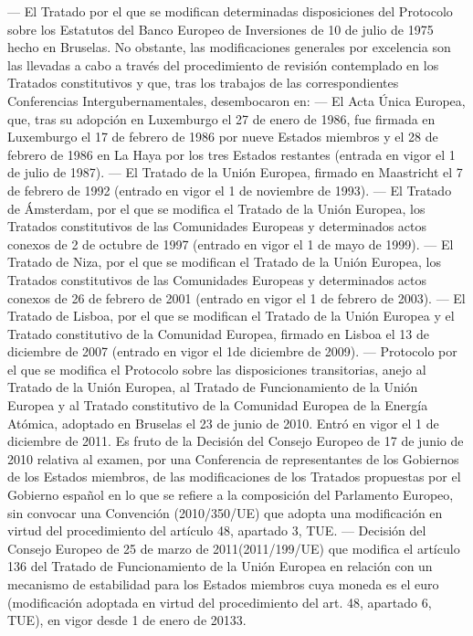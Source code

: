 \documentclass[10pt,a4paper]{article}
\begin{document}
— El Tratado por el que se modifican determinadas disposiciones del Protocolo sobre los Estatutos del Banco Europeo de Inversiones de 10 de julio de 1975 hecho en Bruselas. No obstante, las modificaciones generales por excelencia son las llevadas a cabo a través del procedimiento de revisión contemplado en los Tratados constitutivos y que, tras los trabajos de las correspondientes Conferencias Intergubernamentales, desembocaron en:
— El Acta Única Europea, que, tras su adopción en Luxemburgo el 27 de enero de 1986, fue firmada en Luxemburgo el 17 de febrero de 1986 por nueve Estados miembros y el 28 de febrero de 1986 en La Haya por los tres Estados restantes (entrada en vigor el 1 de julio de 1987).
— El Tratado de la Unión Europea, firmado en Maastricht el 7 de febrero de 1992 (entrado en vigor el 1 de noviembre de 1993).
— El Tratado de Ámsterdam, por el que se modifica el Tratado de la Unión Europea, los Tratados constitutivos de las Comunidades Europeas y determinados actos conexos de 2 de octubre de 1997 (entrado en vigor el 1 de mayo de 1999).
— El Tratado de Niza, por el que se modifican el Tratado de la Unión Europea, los Tratados constitutivos de las Comunidades Europeas y determinados actos conexos de 26 de febrero de 2001 (entrado en vigor el 1 de febrero de 2003). 
— El Tratado de Lisboa, por el que se modifican el Tratado de la Unión Europea y el Tratado constitutivo de la Comunidad Europea, firmado en Lisboa el 13 de diciembre de 2007 (entrado en vigor el 1de diciembre de 2009).
— Protocolo por el que se modifica el Protocolo sobre las disposiciones transitorias, anejo al Tratado de la Unión Europea, al Tratado de Funcionamiento de la Unión Europea y al Tratado constitutivo de la Comunidad Europea de la Energía Atómica, adoptado en Bruselas el 23 de junio de 2010. Entró en vigor el 1 de diciembre de 2011. Es fruto de la Decisión del Consejo Europeo de 17 de junio de 2010 relativa al examen, por una Conferencia de representantes de los Gobiernos de los Estados miembros, de las modificaciones de los Tratados propuestas por el Gobierno español en lo que se refiere a la composición del Parlamento Europeo, sin convocar una Convención (2010/350/UE) que adopta una modificación en virtud del procedimiento del artículo 48, apartado 3, TUE.
— Decisión del Consejo Europeo de 25 de marzo de 2011(2011/199/UE) que modifica el artículo 136 del Tratado de Funcionamiento de la Unión Europea en relación con un mecanismo de estabilidad para los Estados miembros cuya moneda es el euro  (modificación adoptada en virtud del procedimiento del art. 48, apartado 6, TUE), en vigor desde 1 de enero de 20133.
\end{document}
